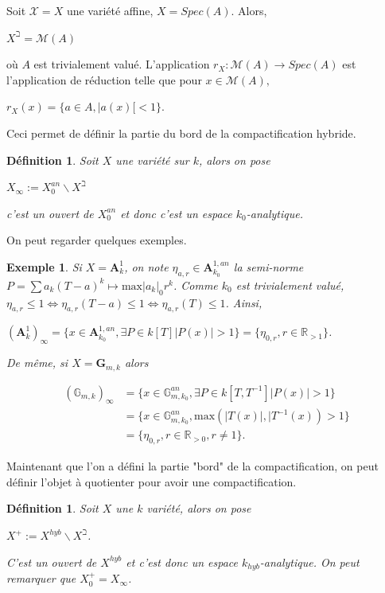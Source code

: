 \documentclass[11pt]{article}
\newcommand{\R}{\mathbb{R}}
\newcommand{\ana}{\mathbf{A}}
\newtheorem{defi}[thm]{Définition}
\newtheorem{ex}[thm]{Exemple}
\begin{document}
Soit $\mathcal{X} = X$ une variété affine, $X = Spec(A)$. Alors,
\begin{center}
$X^\beth = \mathcal{M}(A)$
\end{center}
où $A$ est trivialement valué. L'application $r_X : \mathcal{M}(A) \rightarrow Spec(A)$ est l'application de réduction telle que pour $x\in \mathcal{M}(A),$
\begin{center}
$r_X(x) = \lbrace a\in A, |a(x)[ <1 \rbrace$.
\end{center}

Ceci permet de définir la partie du bord de la compactification hybride.

\begin{defi}
Soit $X$ une variété sur $k$, alors on pose 
\begin{center}
$X_\infty := X^{an}_0 \backslash X^\beth$
\end{center}
c'est un ouvert de $X^{an}_0$ et donc c'est un espace $k_0$-analytique.
\end{defi}

On peut regarder quelques exemples.
\begin{ex}\label{exemple de X infty}
Si $X = \ana^1_k$, on note $\eta_{a,r} \in \ana^{1,an}_{k_0}$ la semi-norme $P = \sum a_k(T-a)^k \mapsto \mathrm{max}|a_k|_0 r^k$. Comme $k_0$ est trivialement valué, $\eta_{a,r} \leq 1 \iff \eta_{a,r}(T-a) \leq 1 \iff \eta_{a,r}(T) \leq 1$. Ainsi,

\begin{center}
$(\ana^1_k)_\infty = \lbrace x\in \ana^{1,an}_{k_0}, \exists P\in k[T] |P(x)| >1\rbrace = \lbrace \eta_{0,r}, r\in \R_{>1}\rbrace$.
\end{center}

De même, si $X = \mathbf{G}_{m,k}$ alors

\begin{align*}
(\mathbb{G}_{m,k})_\infty &= \lbrace x\in \mathbb{G}^{an}_{m,k_0}, \exists P\in k[T, T^{-1}] |P(x)| >1\rbrace \\
&= \lbrace x\in \mathbb{G}^{an}_{m,k_0}, \mathrm{max} (|T(x)|, |T^{-1}(x)) >1\rbrace \\
&= \lbrace \eta_{0,r}, r\in \R_{>0}, r\neq 1\rbrace.
\end{align*}
\end{ex}

Maintenant que l'on a défini la partie "bord" de la compactification, on peut définir l'objet à quotienter pour avoir une compactification.

\begin{defi}
Soit $X$ une $k$ variété, alors on pose 
\begin{center}
$X^+ := X^{hyb} \backslash X^\beth$.
\end{center}
C'est un ouvert de $X^{hyb}$ et c'est donc un espace $k_{hyb}$-analytique. On peut remarquer que $X^+_0 = X_\infty$.
\end{defi}
\end{document}

